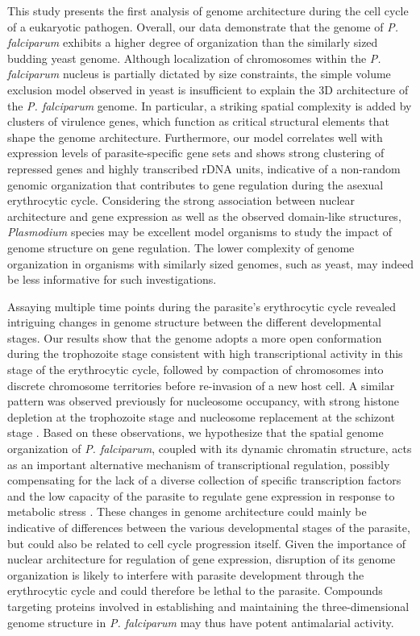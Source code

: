 This study presents the first analysis of genome architecture during the cell
cycle of a eukaryotic pathogen. Overall, our data demonstrate that the genome
of {\em P. falciparum} exhibits a higher degree of organization than the
similarly sized budding yeast genome. Although localization of chromosomes
within the {\em P. falciparum} nucleus is partially dictated by size
constraints, the simple volume exclusion model observed in yeast is
insufficient to explain the 3D architecture of the {\em P. falciparum} genome.
In particular, a striking spatial complexity is added by clusters of virulence
genes, which function as critical structural elements that shape the genome
architecture. Furthermore, our model correlates well with expression levels of
parasite-specific gene sets and shows strong clustering of repressed genes and
highly transcribed rDNA units, indicative of a non-random genomic organization
that contributes to gene regulation during the asexual erythrocytic cycle.
Considering the strong association between nuclear architecture and gene
expression as well as the observed domain-like structures, {\em Plasmodium}
species may be excellent model organisms to study the impact of genome
structure on gene regulation. The lower complexity of genome organization in
organisms with similarly sized genomes, such as yeast, may indeed be less
informative for such investigations.

Assaying multiple time points during the parasite's erythrocytic cycle
revealed intriguing changes in genome structure between the different
developmental stages. Our results show that the genome adopts a more open
conformation during the trophozoite stage consistent with high transcriptional
activity in this stage of the erythrocytic cycle, followed by compaction of
chromosomes into discrete chromosome territories before re-invasion of a new
host cell. A similar pattern was observed previously for nucleosome occupancy,
with strong histone depletion at the trophozoite stage and nucleosome
replacement at the schizont stage \citep{ponts:nucleosome}. Based on these
observations, we hypothesize that the spatial genome organization of {\em P.
falciparum}, coupled with its dynamic chromatin structure, acts as an
important alternative mechanism of transcriptional regulation, possibly
compensating for the lack of a diverse collection of specific transcription
factors \citep{balaji:discovery, coulson:comparative} and the low capacity of
the parasite to regulate gene expression in response to metabolic stress
\citep{ganesan:genetically, leroch:systematic}. These changes in genome
architecture could mainly be indicative of differences between the various
developmental stages of the parasite, but could also be related to cell cycle
progression itself. Given the importance of nuclear architecture for
regulation of gene expression, disruption of its genome organization is likely
to interfere with parasite development through the erythrocytic cycle and
could therefore be lethal to the parasite. Compounds targeting proteins
involved in establishing and maintaining the three-dimensional genome
structure in {\em P. falciparum} may thus have potent antimalarial activity.

